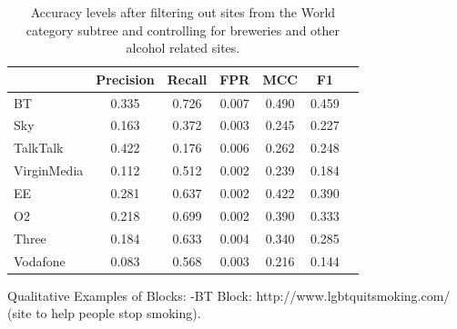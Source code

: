 \documentclass{bmcart}
\begin{document}
\begin{table}[h!]
\caption{Accuracy levels after filtering out sites from the World category subtree and controlling for breweries and other alcohol related sites.}
  \begin{tabular}{ l c c c c c c}
    \hline
     & Precision & Recall & FPR & MCC & F1 \\
    \hline
	BT & 0.335 & 0.726 & 0.007 & 0.490 & 0.459 \\
    Sky & 0.163 & 0.372 & 0.003 & 0.245 & 0.227 \\
    TalkTalk & 0.422 & 0.176 & 0.006 & 0.262 & 0.248 \\
	VirginMedia & 0.112 & 0.512 & 0.002 & 0.239 & 0.184 \\
	\hline    
	EE & 0.281 & 0.637 & 0.002 & 0.422 & 0.390 \\
	O2 & 0.218 & 0.699 & 0.002 & 0.390 & 0.333 \\
	Three & 0.184 & 0.633 & 0.004 & 0.340 & 0.285 \\
	Vodafone & 0.083 & 0.568 & 0.003 & 0.216 & 0.144 \\
    \hline
  \end{tabular}
\end{table}




Qualitative Examples of Blocks:
-BT Block: http://www.lgbtquitsmoking.com/ (site to help people stop smoking).
\end{document}

